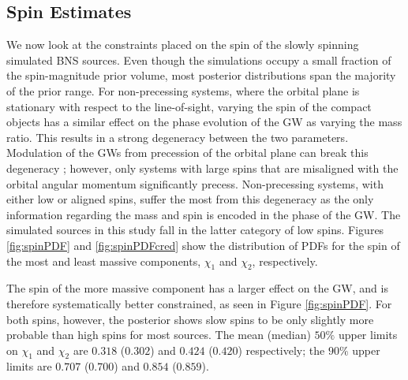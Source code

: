 \subsection{Spin Estimates}\label{sec:spin-magnitudes}
We now look at the constraints placed on the spin of the slowly spinning simulated BNS sources.  Even though the simulations occupy a small fraction of the spin-magnitude prior volume, most posterior distributions span the majority of the prior range. For non-precessing systems, where the orbital plane is stationary with respect to the line-of-sight, varying the spin of the compact objects has a similar effect on the phase evolution of the GW as varying the mass ratio. This results in a strong degeneracy between the two parameters.  Modulation of the GWs from precession of the orbital plane can break this degeneracy \citep{Vecchio_2004,Lang_2006,Vitale_2014,Chatziioannou_2014}; however, only systems with large spins that are misaligned with the orbital angular momentum significantly precess. Non-precessing systems, with either low or aligned spins, suffer the most from this degeneracy as the only information regarding the mass and spin is encoded in the phase of the GW.  The simulated sources in this study fall in the latter category of low spins.  Figures \ref{fig:spinPDF} and \ref{fig:spinPDFcred} show the distribution of PDFs for the spin of the most and least massive components, $\chi_1$ and $\chi_2$, respectively.

The spin of the more massive component has a larger effect on the GW, and is therefore systematically better constrained, as seen in Figure \ref{fig:spinPDF}.  For both spins, however, the posterior shows slow spins to be only slightly more probable than high spins for most sources. The mean (median) $50\%$ upper limits on $\chi_1$ and $\chi_2$ are $0.318$ ($0.302$) and $0.424$ ($0.420$) respectively; the $90\%$ upper limits are $0.707$ ($0.700$) and $0.854$ ($0.859$).
  
  
  
  
  
  
  
  